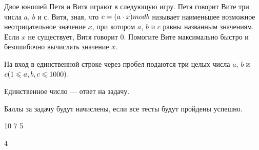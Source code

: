 
Двое юношей Петя и Витя играют в следующую игру. Петя говорит Вите три числа $a$, $b$ и $с$. Витя, зная, что $c = (a \cdot x)\space mod\space b$  
называет наименьшее возможное неотрицательное значение $x$, при котором $a$, $b$ и $c$ равны названным значениям. 
Если $x$ не существует, Витя говорит $0$. Помогите Вите максимально быстро и безошибочно вычислять значение $x$.

На вход в единственной строке через пробел подаются три целых числа $a$, $b$ и $c\space (1 \leq a, b, c \leq 1000)$.

\outputfmtSection
Единственное число — ответ на задачу.

\markSection

Баллы за задачу будут начислены, если все тесты будут пройдены успешно.


\begin{myverbbox}[\small]{\vinput}
    10 7 5
\end{myverbbox}
\begin{myverbbox}[\small]{\voutput}
    4
\end{myverbbox}

